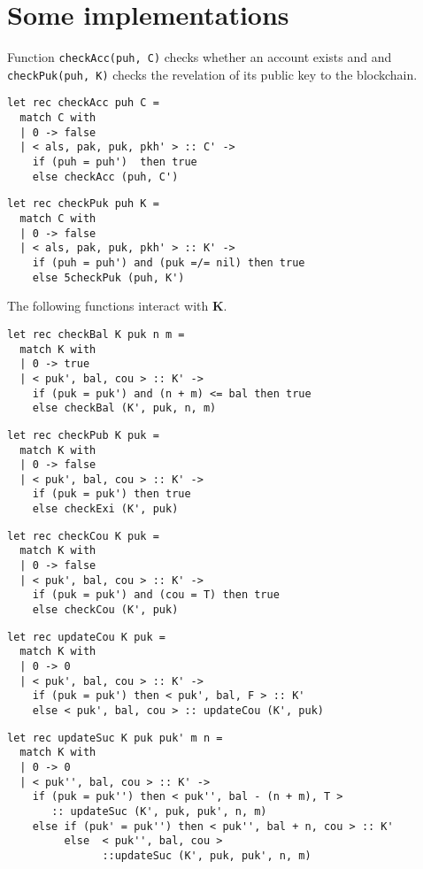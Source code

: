 \documentclass[a4paper]{llncs}
\begin{document}
\section{Some implementations}
Function \verb!checkAcc(puh, C)! checks whether an account exists and and \verb!checkPuk(puh, K)! checks the revelation of its public key to the blockchain.
\begin{verbatim}
let rec checkAcc puh C =
  match C with
  | 0 -> false
  | < als, pak, puk, pkh' > :: C' ->
    if (puh = puh')  then true 
    else checkAcc (puh, C')
\end{verbatim}

\begin{verbatim}
let rec checkPuk puh K =
  match C with
  | 0 -> false
  | < als, pak, puk, pkh' > :: K' ->
    if (puh = puh') and (puk =/= nil) then true 
    else 5checkPuk (puh, K')
\end{verbatim}

The following functions interact with $\mathbf{K}$. 

\begin{verbatim}
let rec checkBal K puk n m =
  match K with
  | 0 -> true
  | < puk', bal, cou > :: K' ->
    if (puk = puk') and (n + m) <= bal then true 
    else checkBal (K', puk, n, m)
\end{verbatim}

\begin{verbatim}
let rec checkPub K puk =
  match K with
  | 0 -> false
  | < puk', bal, cou > :: K' ->
    if (puk = puk') then true 
    else checkExi (K', puk)
\end{verbatim}

\begin{verbatim}
let rec checkCou K puk =
  match K with
  | 0 -> false
  | < puk', bal, cou > :: K' ->
    if (puk = puk') and (cou = T) then true 
    else checkCou (K', puk)
\end{verbatim}

\begin{verbatim}
let rec updateCou K puk =
  match K with
  | 0 -> 0
  | < puk', bal, cou > :: K' ->
    if (puk = puk') then < puk', bal, F > :: K'
    else < puk', bal, cou > :: updateCou (K', puk)
\end{verbatim}

\begin{verbatim}
let rec updateSuc K puk puk' m n =
  match K with
  | 0 -> 0
  | < puk'', bal, cou > :: K' ->
    if (puk = puk'') then < puk'', bal - (n + m), T > 
       :: updateSuc (K', puk, puk', n, m)
    else if (puk' = puk'') then < puk'', bal + n, cou > :: K'
         else  < puk'', bal, cou > 
               ::updateSuc (K', puk, puk', n, m)
\end{verbatim}
\end{document}
